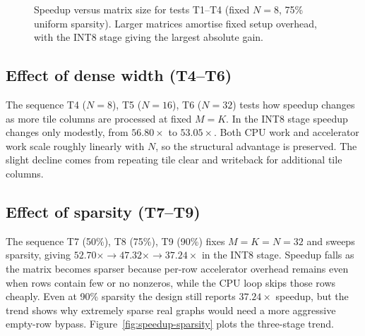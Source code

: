 \begin{figure}[htbp]
  \centering
  \caption{Speedup versus matrix size for tests T1--T4 (fixed $N = 8$,
           75\% uniform sparsity). Larger matrices amortise fixed setup
           overhead, with the INT8 stage giving the largest absolute gain.}
  \label{fig:speedup-size}
\end{figure}

\subsection{Effect of dense width (T4--T6)}

The sequence T4 ($N = 8$), T5 ($N = 16$), T6 ($N = 32$) tests how
speedup changes as more tile columns are processed at fixed $M = K$.
In the INT8 stage speedup changes only modestly, from $56.80\times$ to
$53.05\times$. Both CPU work and accelerator work scale roughly linearly
with $N$, so the structural advantage is preserved. The slight decline
comes from repeating tile clear and writeback for additional tile
columns.

\subsection{Effect of sparsity (T7--T9)}

The sequence T7 (50\%), T8 (75\%), T9 (90\%) fixes $M = K = N = 32$
and sweeps sparsity, giving $52.70\times \to 47.32\times \to
37.24\times$ in the INT8 stage. Speedup falls as the matrix becomes
sparser because per-row accelerator overhead remains even when rows
contain few or no nonzeros, while the CPU loop skips those rows cheaply.
Even at 90\% sparsity the design still reports $37.24\times$ speedup,
but the trend shows why extremely sparse real graphs would need a more
aggressive empty-row bypass. Figure~\ref{fig:speedup-sparsity} plots
the three-stage trend.

